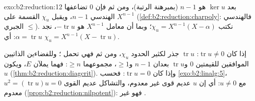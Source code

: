 \begin{solution}{exo:b2:reduction:12}
بعد $\ker u$ هو $n - 1$ (بمبرهنة الرتبة)، ومن ثم فإن $0$
 تضاعفها الهندسي $n - 1$، ويقبل $\chi_u$
القسمة على $X^{n-1}$
(\cref{def:b2:reduction:charpoly}: فالهندسي $\leq$ الجبري).
نكتب $\chi_u = X^{n-1}(X - \alpha)$؛ وبما أن معامل
$X^{n-1}$ هو $-\operatorname{tr} u$، نجد $\alpha =
\operatorname{tr} u$: أي $\chi_u = X^{n-1}(X - \operatorname{tr}
u)$.

إذا كان $\operatorname{tr} u \neq 0$: 
$\operatorname{tr} u$ جذر لكثير الحدود $\chi_u$، ومن ثم فهي تحمل
؛ وللفضاءين الذاتيين الموافقين للقيمتين $0$ و$\operatorname{tr} u$
بعدان $n - 1$ و$\geq 1$، مجموعهما $\geq n$: فهما
يملآن $E$، ويكون $u$ 
(\cref{thm:b2:reduction:diagcrit}). وإذا كان $\operatorname{tr} u = 0$:
فحسب \cref{exo:b2:linalg:5}، $u^2 = (\operatorname{tr} u)u = 0$
مع $u \neq 0$: أي إن $u$ عديم قوى غير معدوم، والتشاكل عديم القوى
 معدوم (\cref{prop:b2:reduction:nilpotent}): فهو غير
.
\end{solution}

